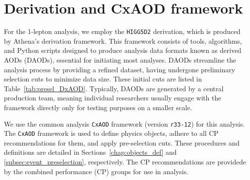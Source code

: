 \section{Derivation and CxAOD framework}
\label{subsec:DxAOD_and_CxAOD}
For the 1-lepton analysis, we employ the \texttt{HIGG5D2} derivation, which is produced by Athena's derivation framework. This framework consists of tools, algorithms, and Python scripts designed to produce analysis data formats known as derived AODs (DAODs), essential for initiating most analyses. 
DAODs streamline the analysis process by providing a refined dataset, having undergone preliminary selection cuts to minimize data size. These initial cuts are listed in Table~\ref{tab:presel_DxAOD}. Typically, DAODs are generated by a central production team, meaning individual researchers usually engage with the framework directly only for testing purposes on a smaller scale.

\begin{table}[t]
\caption{Pre-selections in the derivation framework for data size reduction. 
$N_j$, $N_J^{\textrm{TCC}}$, and $N_J^{\textrm{LCTopo}}$ represent the counts of different types of jets.} 
\label{tab:presel_DxAOD}
\begin{center}
\end{center}
\end{table}

We use the common analysis \texttt{CxAOD} framework (version \texttt{r33-12}) for this analysis.
The \texttt{CxAOD} framework is used to define physics objects, adhere to all CP recommendations for them, and apply pre-selection cuts.
These procedures and definitions are detailed in Sections~\ref{chap:objects_def} and \ref{subsec:event_preselection}, respectively.
The CP recommendations are providede by the combined performance (CP) groups for use in analysis.

